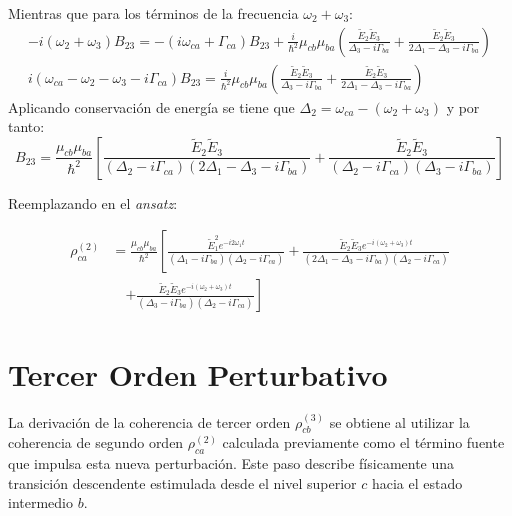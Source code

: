 \documentclass[12pt,a4paper]{article}
\begin{document}
Mientras que para los términos de la frecuencia $\omega_2 + \omega_3$: 
\begin{align}
    -i(\omega_2  + \omega_3)B_{23} = -(i\omega_{ca} + \Gamma_{ca})B_{23} + \frac{i}{\hbar^2}\mu_{cb}\mu_{ba}\left(\frac{\tilde{E}_2 \tilde{E}_3}{\Delta_3 - i\Gamma_{ba}} + \frac{\tilde{E}_2 \tilde{E}_3}{2\Delta_1 - \Delta_3 - i\Gamma_{ba}}\right)\\
    i(\omega_{ca} - \omega_2  - \omega_3 - i\Gamma_{ca})B_{23} = \frac{i}{\hbar^2}\mu_{cb}\mu_{ba}\left(\frac{\tilde{E}_2 \tilde{E}_3}{\Delta_3 - i\Gamma_{ba}} + \frac{\tilde{E}_2 \tilde{E}_3}{2\Delta_1 - \Delta_3 - i\Gamma_{ba}}\right)
\end{align}
Aplicando conservación de energía se tiene que $\Delta_2= \omega_{ca} - (\omega_2 + \omega_3)$ y por tanto:
\begin{equation}
B_{23} = \frac{\mu_{cb} \mu_{ba}}{\hbar^2} \left[ \frac{\tilde{E}_2 \tilde{E}_3}{(\Delta_2 - i\Gamma_{ca})(2\Delta_1 - \Delta_3 - i\Gamma_{ba})} + \frac{\tilde{E}_2 \tilde{E}_3}{(\Delta_2 - i\Gamma_{ca})(\Delta_3 - i\Gamma_{ba})} \right]
\end{equation}

Reemplazando en el \textit{ansatz}:

\begin{equation}
\begin{aligned}
\rho_{ca}^{(2)} &= \frac{\mu_{cb}\mu_{ba}}{\hbar^2} \left[ \frac{\tilde{E}_1^2 e^{-i2\omega_1 t}}{(\Delta_1 - i\Gamma_{ba})(\Delta_2 - i\Gamma_{ca})} \right. + \frac{\tilde{E}_2\tilde{E}_3 e^{-i(\omega_2+\omega_3)t}}{(2\Delta_1 - \Delta_3 - i\Gamma_{ba})(\Delta_2 - i\Gamma_{ca})} \\
&\quad \left. + \frac{\tilde{E}_2\tilde{E}_3 e^{-i(\omega_2+\omega_3)t}}{(\Delta_3 - i\Gamma_{ba})(\Delta_2 - i\Gamma_{ca})} \right]
\end{aligned} 
\end{equation}

\section{Tercer Orden Perturbativo}

La derivación de la coherencia de tercer orden $\rho_{cb}^{(3)}$ se obtiene al utilizar la coherencia de segundo orden $\rho_{ca}^{(2)}$ calculada previamente como el término fuente que impulsa esta nueva perturbación. Este paso describe físicamente una transición descendente estimulada desde el nivel superior $c$ hacia el estado intermedio $b$.
\end{document}
